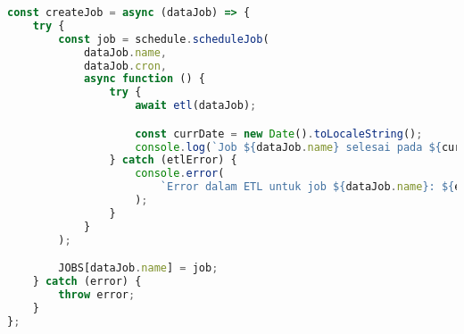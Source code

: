 \begin{lstlisting}[language=Javascript,caption={Penjadwalan Job}]
const createJob = async (dataJob) => {
	try {
		const job = schedule.scheduleJob(
			dataJob.name,
			dataJob.cron,
			async function () {
				try {
					await etl(dataJob);

					const currDate = new Date().toLocaleString();
					console.log(`Job ${dataJob.name} selesai pada ${currDate}`);
				} catch (etlError) {
					console.error(
						`Error dalam ETL untuk job ${dataJob.name}: ${etlError.message}`
					);
				}
			}
		);

		JOBS[dataJob.name] = job;
	} catch (error) {
		throw error;
	}
};
\end{lstlisting}